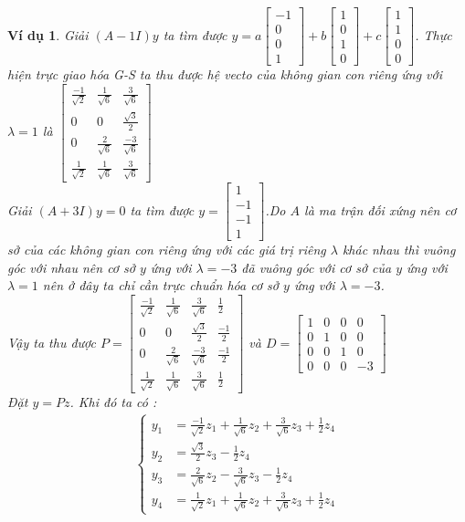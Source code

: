 \documentclass[12pt,a4paper]{book}
\newtheorem{vd}{Ví dụ}
\newcommand{\m}[1]{
\begin{bmatrix}
#1
\end{bmatrix}
}
\newcommand{\s}[1]{
\sqrt{#1}
}
\newcommand{\n}[1]{
\left(#1\right)
}
\begin{document}
\begin{vd}
Giải $\n{A - 1I}y$ ta tìm được $y = a\m{-1\\0\\0\\1} + b\m{1\\0\\1\\0} + c\m{1\\1\\0\\0}$.
Thực hiện trực giao hóa G-S ta thu được hệ vecto của không gian con riêng ứng với $\lambda = 1$ là $\m{
\frac{-1}{\s{2}} & \frac{1}{\s{6}} & \frac{3}{\s{6}}\\
0 & 0 & \frac{\s{3}}{2}\\
0 & \frac{2}{\s{6}} & \frac{-3}{\s{6}}\\
\frac{1}{\s{2}} & \frac{1}{\s{6}} & \frac{3}{\s{6}}
}
$ \\
Giải $\n{A + 3I}y = 0$ ta tìm được $y = \m{1\\-1\\-1\\1}$.Do $A$ là ma trận đối xứng nên cơ sở của các không gian con riêng ứng với các giá trị riêng $\lambda$ khác nhau thì vuông góc với nhau nên cơ sở $y$ ứng với $\lambda = -3$ đã vuông góc với cơ sở của $y$ ứng với $\lambda = 1$ nên ở đây ta chỉ cần trực chuẩn hóa cơ sở $y$ ứng với $\lambda = -3$. \\
Vậy ta thu được $P = \m{
\frac{-1}{\s{2}} & \frac{1}{\s{6}} & \frac{3}{\s{6}} & \frac{1}{2}\\
0 & 0 & \frac{\s{3}}{2} & \frac{-1}{2}\\
0 & \frac{2}{\s{6}} & \frac{-3}{\s{6}} & \frac{-1}{2}\\
\frac{1}{\s{2}} & \frac{1}{\s{6}} & \frac{3}{\s{6}} & \frac{1}{2}
}$ và $D = \m{
1 & 0 & 0 & 0 \\
0 & 1 & 0 & 0 \\
0 & 0 & 1 & 0 \\
0 & 0 & 0 & -3
}$ \\
Đặt $y = Pz$. Khi đó ta có : 
\begin{align}
\begin{cases}
y_1 &= \frac{-1}{\s{2}}z_1 + \frac{1}{\s{6}}z_2 + \frac{3}{\s{6}}z_3 + \frac{1}{2}z_4 \\
y_2 &= \frac{\s{3}}{2}z_3 - \frac{1}{2}z_4\\
y_3 &= \frac{2}{\s{6}}z_2 - \frac{3}{\s{6}}z_3 - \frac{1}{2}z_4 \\
y_4 &= \frac{1}{\s{2}}z_1 + \frac{1}{\s{6}}z_2 + \frac{3}{\s{6}}z_3 + \frac{1}{2}z_4
\end{cases}

\end{align}
\end{vd}
\end{document}

